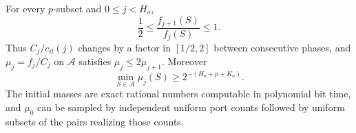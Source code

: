 \begin{lemma}
\label{lem:counting-initialization}
For every $p$-subset and $0\leq j<H_o$,
\begin{equation}
 \frac12\leq\frac{f_{j+1}(S)}{f_j(S)}\leq1.
 \label{eq:counting-adjacent}
\end{equation}
Thus $C_j/c_{il}(j)$ changes by a factor in $[1/2,2]$ between
consecutive phases, and $\mu_j=f_j/C_j$ on $\mathcal A$ satisfies
$\mu_j\leq2\mu_{j+1}$.  Moreover
\begin{equation}
 \min_{S\in\mathcal A}\mu_j(S)
       \geq2^{-(H_o+p+K_o)}.
 \label{eq:counting-minimum}
\end{equation}
The initial masses are exact rational numbers computable in polynomial
bit time, and $\mu_0$ can be sampled by independent uniform port counts
followed by uniform subsets of the pairs realizing those counts.
\end{lemma}

